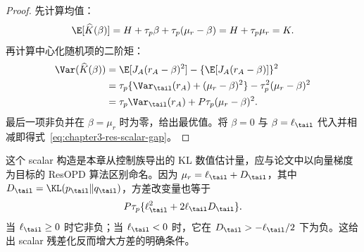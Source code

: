 \begin{proof}
先计算均值：
\[
 \E[\widehat K(\beta)]=H+\tau_p\beta+\tau_p(\mu_r-\beta)=H+\tau_p\mu_r=K.
\]
再计算中心化随机项的二阶矩：
\begin{align*}
 \Var(\widehat K(\beta))
 &=\E[J_A(r_A-\beta)^2]-\{\E[J_A(r_A-\beta)]\}^2\\
 &=\tau_p\{\Var_{\tail}(r_A)+(\mu_r-\beta)^2\}
   -\tau_p^2(\mu_r-\beta)^2\\
 &=\tau_p\Var_{\tail}(r_A)+P\tau_p(\mu_r-\beta)^2.
\end{align*}
最后一项非负并在 $\beta=\mu_r$ 时为零，给出最优值。将 $\beta=0$ 与 $\beta=\ell_{\tail}$ 代入并相减即得式~\eqref{eq:chapter3-res-scalar-gap}。
\end{proof}

这个 scalar 构造是本章从控制族导出的 KL 数值估计量，应与论文中以向量梯度为目标的 ResOPD 算法区别命名。因为 $\mu_r=\ell_{\tail}+D_{\tail}$，其中 $D_{\tail}=\KL(p_\tail\Vert q_\tail)$，方差改变量也等于
\[
 P\tau_p\{\ell_{\tail}^2+2\ell_{\tail}D_{\tail}\}.
\]
当 $\ell_{\tail}\geq0$ 时它非负；当 $\ell_{\tail}<0$ 时，它在 $D_{\tail}>-\ell_{\tail}/2$ 下为负。这给出 scalar 残差化反而增大方差的明确条件。
